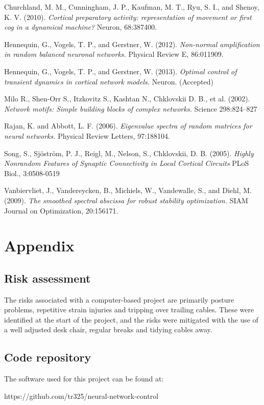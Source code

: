 \documentclass[12pt, a4paper]{article}
\begin{document}
\pagebreak
\begin{thebibliography}{9}

    Churchland, M. M., Cunningham, J. P., Kaufman, M. T., Ryu, S. I., and Shenoy, K. V. (2010). 
    \emph{Cortical preparatory activity: representation of movement or first cog in a dynamical machine?}
    Neuron, 68:387400.

    Hennequin, G., Vogels, T. P., and Gerstner, W. (2012). 
    \emph{Non-normal amplification in random balanced neuronal networks.} 
    Physical Review E, 86:011909.
    
    Hennequin, G., Vogels, T. P., and Gerstner, W. (2013).
    \emph{Optimal control of transient dynamics in cortical network models.}
    Neuron. (Accepted)  

    Milo R., Shen-Orr S., Itzkovitz S., Kashtan N., Chklovskii D. B., et al. (2002).
    \emph{Network motifs: Simple building blocks of complex networks.} 
    Science 298:824–827    

   
    Rajan, K. and Abbott, L. F. (2006). 
    \emph{Eigenvalue spectra of random matrices for neural networks.}
    Physical Review Letters, 97:188104.  
    
    Song, S., Sj{\"o}str{\"o}m, P. J., Reigl, M., Nelson, S., Chklovskii, D. B. (2005).
    \emph{Highly Nonrandom Features of Synaptic Connectivity in Local Cortical Circuits}
    PLoS Biol., 3:0508-0519
    
    Vanbiervliet, J., Vandereycken, B., Michiels, W., Vandewalle, S., and Diehl, M. (2009). 
    \emph{The smoothed spectral abscissa for robust stability optimization.}
    SIAM Journal on Optimization, 20:156171.

\end{thebibliography}

\pagebreak
\section{Appendix}

\subsection{Risk assessment}

The risks associated with a computer-based project are primarily posture problems, repetitive strain injuries and tripping over trailing cables.  These were identified at the start of the project, and the risks were mitigated with the use of a well adjusted desk chair, regular breaks and tidying cables away. 

\vspace{2cm}

\subsection{Code repository}

The software used for this project can be found at:

https://github.com/tr325/neural-network-control
\end{document}
